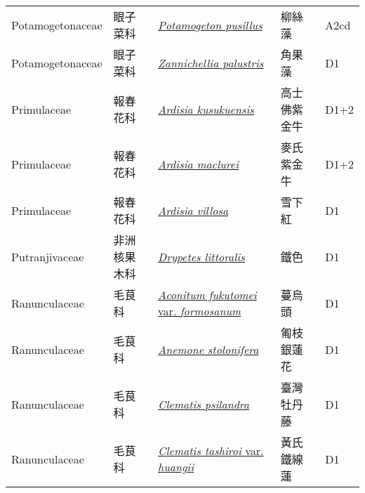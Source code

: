 {\begin{longtable}{p{2.5cm}p{2.5cm}p{4.5cm}p{2.5cm}p{3cm}}
    Potamogetonaceae & 眼子菜科 & \href{http://www.theplantlist.org/tpl1.1/search?q=Potamogeton+pusillus}{\textit{Potamogeton pusillus} } & 柳絲藻 & A2cd \index{Potamogeton@\textit{Potamogeton}!pusillus@\textit{pusillus}}  \index{柳絲藻} \\
    Potamogetonaceae & 眼子菜科 & \href{http://www.theplantlist.org/tpl1.1/search?q=Zannichellia+palustris}{\textit{Zannichellia palustris} } & 角果藻 & D1 \index{Zannichellia@\textit{Zannichellia}!palustris@\textit{palustris}}  \index{角果藻} \\
    Primulaceae & 報春花科 & \href{http://www.theplantlist.org/tpl1.1/search?q=Ardisia+kusukuensis}{\textit{Ardisia kusukuensis} } & 高士佛紫金牛 & D1+2 \index{Ardisia@\textit{Ardisia}!kusukuensis@\textit{kusukuensis}}  \index{高士佛紫金牛} \\
    Primulaceae & 報春花科 & \href{http://www.theplantlist.org/tpl1.1/search?q=Ardisia+maclurei}{\textit{Ardisia maclurei} } & 麥氏紫金牛 & D1+2 \index{Ardisia@\textit{Ardisia}!maclurei@\textit{maclurei}}  \index{麥氏紫金牛} \\
    Primulaceae & 報春花科 & \href{http://www.theplantlist.org/tpl1.1/search?q=Ardisia+villosa}{\textit{Ardisia villosa} } & 雪下紅 & D1 \index{Ardisia@\textit{Ardisia}!villosa@\textit{villosa}}  \index{雪下紅} \\
    Putranjivaceae & 非洲核果木科 & \href{http://www.theplantlist.org/tpl1.1/search?q=Drypetes+littoralis}{\textit{Drypetes littoralis} } & 鐵色 & D1 \index{Drypetes@\textit{Drypetes}!littoralis@\textit{littoralis}}  \index{鐵色} \\
    Ranunculaceae & 毛茛科 & \href{http://www.theplantlist.org/tpl1.1/search?q=Aconitum+fukutomei+var.+formosanum}{\textit{Aconitum fukutomei} var. \textit{formosanum} } & 蔓烏頭 & D1 \index{Aconitum@\textit{Aconitum}!fukutomei@\textit{fukutomei}!var. formosanum@var. \textit{formosanum}}  \index{蔓烏頭} \\
    Ranunculaceae & 毛茛科 & \href{http://www.theplantlist.org/tpl1.1/search?q=Anemone+stolonifera}{\textit{Anemone stolonifera} } & 匍枝銀蓮花 & D1 \index{Anemone@\textit{Anemone}!stolonifera@\textit{stolonifera}}  \index{匍枝銀蓮花} \\
    Ranunculaceae & 毛茛科 & \href{http://www.theplantlist.org/tpl1.1/search?q=Clematis+psilandra}{\textit{Clematis psilandra} } & 臺灣牡丹藤 & D1 \index{Clematis@\textit{Clematis}!psilandra@\textit{psilandra}}  \index{臺灣牡丹藤} \\
    Ranunculaceae & 毛茛科 & \href{http://www.theplantlist.org/tpl1.1/search?q=Clematis+tashiroi+var.+huangii}{\textit{Clematis tashiroi} var. \textit{huangii} } & 黃氏鐵線蓮 & D1 \index{Clematis@\textit{Clematis}!tashiroi@\textit{tashiroi}!var. huangii@var. \textit{huangii}}  \index{黃氏鐵線蓮} \\

\end{longtable}}

